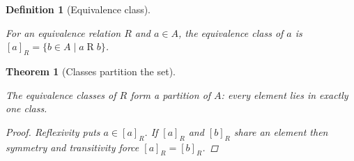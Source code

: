 \documentclass{article}
\newtheorem{definition}{Definition}
\newtheorem{theorem}{Theorem}
\newcommand{\isabelle}[1]{}
\newcommand{\uses}[1]{}
\newcommand{\tags}[1]{}
\begin{document}
\begin{definition}[Equivalence class]
\label{eq-class}
\isabelle{Relations.eq_class_def}
\uses{equivalence}
\tags{quotients}
For an equivalence relation $R$ and $a \in A$, the \emph{equivalence
class} of $a$ is $[a]_R = \{ b \in A \mid a \mathrel{R} b \}$.
\end{definition}

\begin{theorem}[Classes partition the set]
\label{partition}
\isabelle{Relations.classes_partition}
\uses{eq-class, eq-equivalence}
\tags{quotients}
The equivalence classes of $R$ form a partition of $A$: every element
lies in exactly one class.
\begin{proof}
Reflexivity puts $a \in [a]_R$. If $[a]_R$ and $[b]_R$ share an element
then symmetry and transitivity force $[a]_R = [b]_R$.
\end{proof}
\end{theorem}
\end{document}
